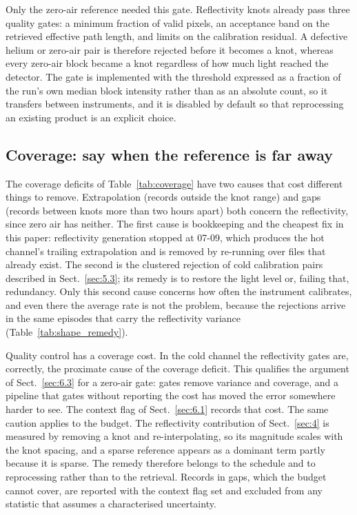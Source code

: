 Only the zero-air reference needed this gate. Reflectivity knots already pass three quality gates: a minimum fraction
of valid pixels, an acceptance band on the retrieved effective path length, and limits on the calibration residual.
A defective helium or zero-air pair is therefore rejected before it becomes a knot, whereas every zero-air block became
a knot regardless of how much light reached the detector. The gate is implemented with the threshold expressed as a fraction
of the run's own median block intensity rather than as an absolute count, so it transfers between instruments, and it
is disabled by default so that reprocessing an existing product is an explicit choice.

\subsection{Coverage: say when the reference is far away}
\label{sec:6.4}

The coverage deficits of Table~\ref{tab:coverage} have two causes that cost different things to remove. Extrapolation
(records outside the knot range) and gaps (records between knots more than two hours apart) both concern the
reflectivity, since zero air has neither. The first cause is bookkeeping and the cheapest fix in this paper:
reflectivity generation stopped at 07-09, which produces the hot channel's trailing extrapolation and is removed by
re-running over files that already exist. The second is the clustered rejection of cold calibration pairs described in
Sect.~\ref{sec:5.3}; its remedy is to restore the light level or, failing that, redundancy. Only this second cause
concerns how often the instrument calibrates, and even there the average rate is not the problem, because the
rejections arrive in the same episodes that carry the reflectivity variance (Table~\ref{tab:shape_remedy}).

Quality control has a coverage cost. In the cold channel the reflectivity gates are, correctly, the proximate cause of
the coverage deficit. This qualifies the argument of Sect.~\ref{sec:6.3} for a zero-air gate: gates remove variance and
coverage, and a pipeline that gates without reporting the cost has moved the error somewhere harder to see. The context flag of Sect.~\ref{sec:6.1} records that cost. The same caution applies to the budget. The
reflectivity contribution of Sect.~\ref{sec:4} is measured by removing a knot and re-interpolating, so its magnitude
scales with the knot spacing, and a sparse reference appears as a dominant term partly because it is sparse. The remedy
therefore belongs to the schedule and to reprocessing rather than to the retrieval. Records in gaps, which the budget cannot cover, are reported with the context flag set and excluded from any
statistic that assumes a characterised uncertainty.

